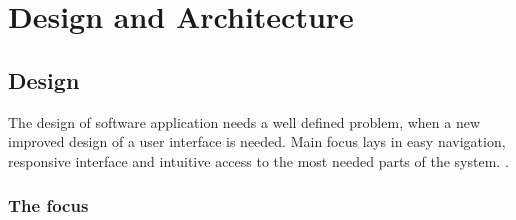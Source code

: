 \chapter{Design and Architecture}
\section{Design}
The design of software application needs a well defined problem, when a new improved design of a user interface is needed. Main focus lays in easy navigation, responsive interface and intuitive access to the most needed parts of the system. .

\subsection{The focus}
